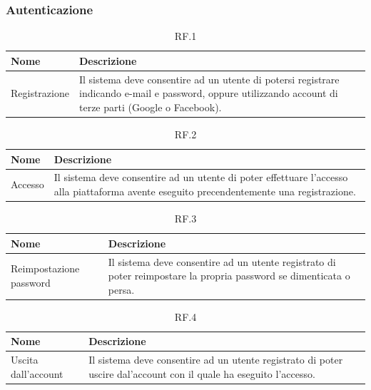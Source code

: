 \documentclass{natourDoc}
\begin{document}
\subsubsection{Autenticazione}
\begin{table}[H]
	\centering
	\begin{tabular}{ |p{5cm}|p{10.3cm}| }
		\hline
		\rowcolor{PineGreen!70}
		\textbf{Nome} & \textbf{Descrizione}                                                                                                                                      \\
		\hline
		Registrazione & Il sistema deve consentire ad un utente di potersi registrare indicando e-mail e password, oppure utilizzando account di terze parti (Google o Facebook). \\
		\hline
	\end{tabular}
	\caption{RF.1}
\end{table}

\begin{table}[H]
	\centering
	\begin{tabular}{ |p{5cm}|p{10.3cm}| }
		\hline
		\rowcolor{PineGreen!70}
		\textbf{Nome} & \textbf{Descrizione}                                                                                                                       \\
		\hline
		Accesso       & Il sistema deve consentire ad un utente di poter effettuare l'accesso alla piattaforma avente eseguito precendentemente una registrazione. \\
		\hline
	\end{tabular}
	\caption{RF.2}

\end{table}

\begin{table}[H]
	\centering
	\begin{tabular}{ |p{5cm}|p{10.3cm}| }
		\hline
		\rowcolor{PineGreen!70}
		\textbf{Nome}           & \textbf{Descrizione}                                                                                                \\
		\hline
		Reimpostazione password & Il sistema deve consentire ad un utente registrato di poter reimpostare la propria password se dimenticata o persa. \\
		\hline
	\end{tabular}
	\caption{RF.3}

\end{table}

\begin{table}[H]
	\centering
	\begin{tabular}{ |p{5cm}|p{10.3cm}| }
		\hline
		\rowcolor{PineGreen!70}
		\textbf{Nome}       & \textbf{Descrizione}                                                                                               \\
		\hline
		Uscita dall'account & Il sistema deve consentire ad un utente registrato di poter uscire dal'account con il quale ha eseguito l'accesso. \\
		\hline
	\end{tabular}
	\caption{RF.4}

\end{table}
\end{document}
